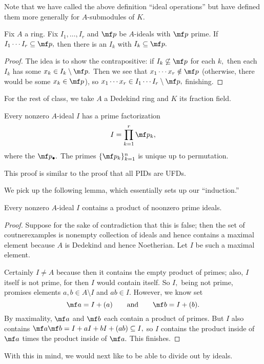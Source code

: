 \documentclass[../notes.tex]{subfiles}
\begin{document}
Note that we have called the above definition ``ideal operations'' but have defined them more generally for $A$-submodules of $K.$
\begin{lem}
    Fix $A$ a ring. Fix $I_1,\ldots,I_r$ and $\mf p$ be $A$-ideals with $\mf p$ prime. If $I_1\cdots I_r\subseteq\mf p,$ then there is an $I_k$ with $I_k\subseteq\mf p.$
\end{lem}
\begin{proof}
    The idea is to show the contrapositive: if $I_k\not\subseteq\mf p$ for each $k,$ then each $I_k$ has some $x_k\in I_k\setminus\mf p.$ Then we see that $x_1\cdots x_r\notin\mf p$ (otherwise, there would be some $x_k\in\mf p$), so $x_1\cdots x_r\in I_1\cdots I_r\setminus\mf p,$ finishing.
\end{proof}
For the rest of class, we take $A$ a Dedekind ring and $K$ its fraction field.
\begin{thm}
    Every nonzero $A$-ideal $I$ has a prime factorization
    \[I=\prod_{k=1}^r\mf p_k,\]
    where the $\mf p_\bullet.$ The primes $\{\mf p_k\}_{k=1}^n$ is unique up to permutation.
\end{thm}
\begin{remark}
    This proof is similar to the proof that all PIDs are UFDs.
\end{remark}
We pick up the following lemma, which essentially sets up our ``induction.''
\begin{lem}
    Every nonzero $A$-ideal $I$ contains a product of noonzero prime ideals.
\end{lem}
\begin{proof}
    Suppose for the sake of contradiction that this is false; then the set of coutnerexamples is nonempty collection of ideals and hence contains a maximal element because $A$ is Dedekind and hence Noetherian. Let $I$ be such a maximal element.
    
    Certainly $I\ne A$ because then it contains the empty product of primes; also, $I$ itself is not prime, for then $I$ would contain itself. So $I,$ being not prime, promises elements $a,b\in A\setminus I$ and $ab\in I.$ However, we know set
    \[\mf a=I+(a)\qquad\text{and}\qquad\mf b=I+(b).\]
    By maximality, $\mf a$ and $\mf b$ each contain a product of primes. But $I$ also contains $\mf a\mf b=I+aI+bI+(ab)\subseteq I,$ so $I$ contains the product inside of $\mf a$ times the product inside of $\mf a.$ This finishes.
\end{proof}
With this in mind, we would next like to be able to divide out by ideals.
\end{document}
